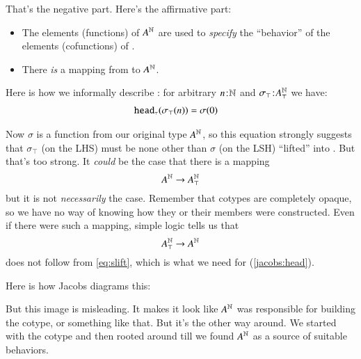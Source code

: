 That's the negative part.  Here's the affirmative part:

\begin{itemize}
\item The elements (functions) of \(A^{\mathbb{N}}\) are used to
  \textit{specify} the ``behavior'' of the elements (cofunctions) of
  .
\item There \textit{is} a mapping from  to \(A^{\mathbb{N}}\).
\end{itemize}

Here is how we informally describe : for arbitrary
\(n\hspace{1pt}\mathpunct{:}\hspace{-1pt}\mathbb{N}\) and \(\sigma_{\top}\hspace{1pt}\mathpunct{:}\hspace{-1pt}A_{\top}^{\mathbb{N}}\) we have:
\begin{align}
  \texttt{\upshape head}_{\scriptscriptstyle\top}(\sigma_{\top}(n)) & = \sigma(0) \label{jacobs:head}
\end{align}

Now \(\sigma\) is a function from our original type \(A^{\mathbb{N}}\), so
this equation strongly suggests that \(\sigma_{\top}\) (on the LHS)
must be none other than \(\sigma\) (on the LSH) ``lifted'' into
. But that's too strong. It \textit{could} be the
case that there is a mapping
\begin{equation}
  A^{\mathbb{N}}\rightarrow A_{\top}^{\mathbb{N}}\label{eq:slift}
\end{equation}
\noindent
but it is not \textit{necessarily} the case. Remember that cotypes are
completely opaque, so we have no way of knowing how they or their
members were constructed. Even if there were such a mapping, simple
logic tells us that
\begin{equation}
  A_{\top}^{\mathbb{N}}\rightarrow A^{\mathbb{N}}
\end{equation}
\noindent
does not follow from \ref{eq:slift}, which is what we need for (\ref{jacobs:head}).

Here is how Jacobs diagrams this:

\vspace{2ex}

%

But this image is misleading. It makes it look like \(A^{\mathbb{N}}\) was
responsible for building the cotype, or something like that. But it's
the other way around. We started with the cotype and then rooted
around till we found \(A^{\mathbb{N}}\) as a source of suitable behaviors.

